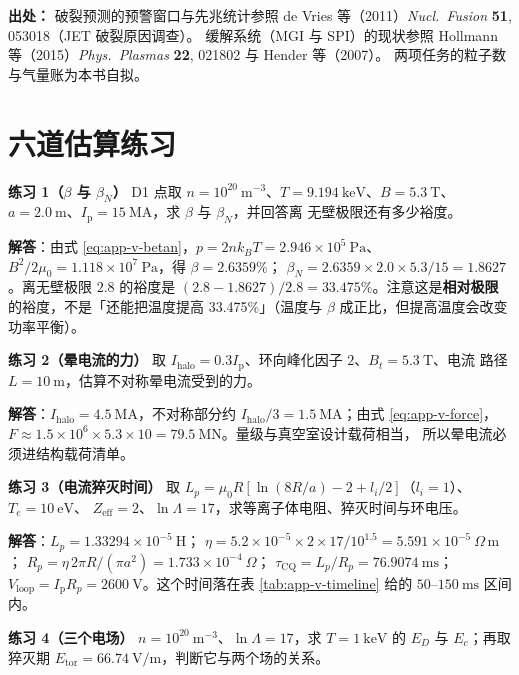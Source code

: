 {\footnotesize
\textbf{出处：} 破裂预测的预警窗口与先兆统计参照 de Vries 等（2011）\textit{Nucl.\
Fusion} \textbf{51}, 053018（JET 破裂原因调查）。
缓解系统（MGI 与 SPI）的现状参照
Hollmann 等（2015）\textit{Phys.\ Plasmas} \textbf{22}, 021802 与 Hender 等（2007）。
两项任务的粒子数与气量账为本书自拟。
}

\section{六道估算练习}
\label{sec:app-v-problems}

\textbf{练习 1（$\beta$ 与 $\beta_N$）}
D1 点取 $n=10^{20}\ \mathrm{m^{-3}}$、$T=9.194\ \mathrm{keV}$、$B=5.3\ \mathrm{T}$、
$a=2.0\ \mathrm{m}$、$I_{\mathrm p}=15\ \mathrm{MA}$，求 $\beta$ 与 $\beta_N$，并回答离
无壁极限还有多少裕度。

\textbf{解答}：由式 \eqref{eq:app-v-betan}，$p=2nk_BT=2.946\times10^{5}\ \mathrm{Pa}$、
$B^2/2\mu_0=1.118\times10^{7}\ \mathrm{Pa}$，得 $\beta=2.6359\%$；
$\beta_N=2.6359\times2.0\times5.3/15=1.8627$。离无壁极限 $2.8$ 的裕度是
$(2.8-1.8627)/2.8=33.475\%$。注意这是\textbf{相对极限}的裕度，不是「还能把温度提高
33.475\%」（温度与 $\beta$ 成正比，但提高温度会改变功率平衡）。

\textbf{练习 2（晕电流的力）}
取 $I_{\mathrm{halo}}=0.3I_{\mathrm p}$、环向峰化因子 $2$、$B_t=5.3\ \mathrm{T}$、电流
路径 $L=10\ \mathrm{m}$，估算不对称晕电流受到的力。

\textbf{解答}：$I_{\mathrm{halo}}=4.5\ \mathrm{MA}$，不对称部分约
$I_{\mathrm{halo}}/3=1.5\ \mathrm{MA}$；由式 \eqref{eq:app-v-force}，
$F\approx1.5\times10^{6}\times5.3\times10=79.5\ \mathrm{MN}$。量级与真空室设计载荷相当，
所以晕电流必须进结构载荷清单。

\textbf{练习 3（电流猝灭时间）}
取 $L_p=\mu_0R[\ln(8R/a)-2+l_i/2]$（$l_i=1$）、$T_e=10\ \mathrm{eV}$、
$Z_{\mathrm{eff}}=2$、$\ln\Lambda=17$，求等离子体电阻、猝灭时间与环电压。

\textbf{解答}：$L_p=1.33294\times10^{-5}\ \mathrm{H}$；
$\eta=5.2\times10^{-5}\times2\times17/10^{1.5}=5.591\times10^{-5}\ \Omega\,\mathrm{m}$；
$R_p=\eta\,2\pi R/(\pi a^2)=1.733\times10^{-4}\ \Omega$；
$\tau_{\mathrm{CQ}}=L_p/R_p=76.9074\ \mathrm{ms}$；
$V_{\mathrm{loop}}=I_{\mathrm p}R_p=2600\ \mathrm{V}$。这个时间落在表
\ref{tab:app-v-timeline} 给的 $50$--$150\ \mathrm{ms}$ 区间内。

\textbf{练习 4（三个电场）}
$n=10^{20}\ \mathrm{m^{-3}}$、$\ln\Lambda=17$，求 $T=1\ \mathrm{keV}$ 的 $E_D$ 与
$E_c$；再取猝灭期 $E_{\mathrm{tor}}=66.74\ \mathrm{V/m}$，判断它与两个场的关系。

